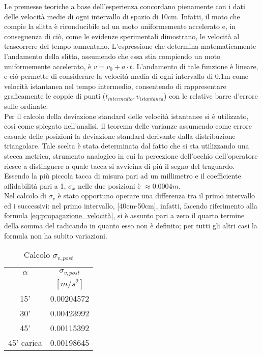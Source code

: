 \documentclass[a4paper,11pt,oneside]{article}
\begin{document}
Le premesse teoriche a base dell'esperienza concordano pienamente con i dati delle velocità medie di ogni intervallo di spazio di 10\si{cm}. Infatti, il moto che compie la slitta è riconducibile ad un moto uniformemente accelerato e, in conseguenza di ciò, come le evidenze sperimentali dimostrano, le velocità al trascorrere del tempo aumentano. L'espressione che determina matematicamente l'andamento della slitta, assumendo che essa stia compiendo un moto uniformemente accelerato, è $v=v_{0}+a\cdot t$. L'andamento di tale funzione è lineare, e ciò permette di considerare la velocità media di ogni intervallo di 0.1\si{m} come velocità istantanea nel tempo intermedio, consentendo di rappresentare graficamente le coppie di punti ($t_{intermedio}, v_{istantanea}$) con  le relative barre d'errore sulle ordinate.\\

Per il calcolo della deviazione standard delle velocità istantanee si è utilizzato, così come spiegato nell'analisi, il teorema delle varianze assumendo come errore casuale delle posizioni la deviazione standard derivante dalla distribuzione triangolare. Tale scelta è stata determinata dal fatto che si sta utilizzando una stecca metrica, strumento analogico in cui la percezione dell'occhio dell'operatore riesce a distinguere a quale tacca si avvicina di più il segno del traguardo. Essendo la più piccola tacca di misura pari ad un millimetro e il coefficiente affidabilità pari a 1, $\sigma_x$ nelle due posizioni è $\approx0.0004\si{m}$.\\
Nel calcolo di $\sigma_v$ è stato opportuno operare una differenza tra il primo intervallo ed i successivi: nel primo intervallo, [40cm-50cm], infatti, facendo riferimento alla formula \ref{eq:propagazione_velocità}, si è assunto pari a zero il quarto termine della somma del radicando in quanto esso non è definito; per tutti gli altri casi la formula non ha subito variazioni.
\begin{wraptable}{l}{5cm}%
    \begin{tabular}{c|c}
        \toprule
        $\alpha$ & $\sigma_{v, post}$ \\
        & $[\si{m/s^{2}}]$\\
        \midrule
        15' &  0.00204572\\
        30' & 0.00423992 \\
        45' & 0.00115392 \\
        45' carica & 0.00198645 \\
        \bottomrule
    \end{tabular}
    \caption{Calcolo $\sigma_{v, post}$}
    \label{tab:v_post}
\end{wraptable}
\end{document}
